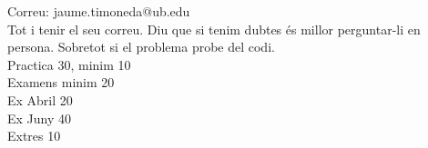 \documentclass{article}
\begin{document}
Correu: jaume.timoneda@ub.edu\\
Tot i tenir el seu correu. Diu que si tenim dubtes és millor perguntar-li en persona. Sobretot si el problema probe del codi.\\

Practica 30, minim 10\\
Examens minim 20\\
Ex Abril 20\\
Ex Juny 40\\
Extres 10
\end{document}
